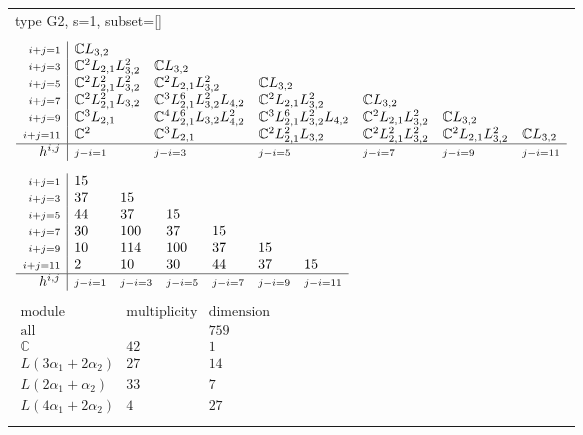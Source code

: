 \documentclass[crop,border=2mm]{standalone}
\begin{document}
\begin{tabular}{l}
{\huge type G2, s=1, subset=[]}\\ \\


$\displaystyle
\begin{array}{r|l l l l l l}
	{\scriptstyle i+j=1}&\mathbb{C}L_{3,2}&&&&&\\
	{\scriptstyle i+j=3}&\mathbb{C}^{2}L_{2,1}L_{3,2}^{2}&\mathbb{C}L_{3,2}&&&&\\
	{\scriptstyle i+j=5}&\mathbb{C}^{2}L_{2,1}^{2}L_{3,2}^{2}&\mathbb{C}^{2}L_{2,1}L_{3,2}^{2}&\mathbb{C}L_{3,2}&&&\\
	{\scriptstyle i+j=7}&\mathbb{C}^{2}L_{2,1}^{2}L_{3,2}&\mathbb{C}^{3}L_{2,1}^{6}L_{3,2}^{2}L_{4,2}&\mathbb{C}^{2}L_{2,1}L_{3,2}^{2}&\mathbb{C}L_{3,2}&&\\
	{\scriptstyle i+j=9}&\mathbb{C}^{3}L_{2,1}&\mathbb{C}^{4}L_{2,1}^{6}L_{3,2}L_{4,2}^{2}&\mathbb{C}^{3}L_{2,1}^{6}L_{3,2}^{2}L_{4,2}&\mathbb{C}^{2}L_{2,1}L_{3,2}^{2}&\mathbb{C}L_{3,2}&\\
	{\scriptstyle i+j=11}&\mathbb{C}^{2}&\mathbb{C}^{3}L_{2,1}&\mathbb{C}^{2}L_{2,1}^{2}L_{3,2}&\mathbb{C}^{2}L_{2,1}^{2}L_{3,2}^{2}&\mathbb{C}^{2}L_{2,1}L_{3,2}^{2}&\mathbb{C}L_{3,2}\\
	\hline h^{i,j}&{\scriptstyle j-i=1}&{\scriptstyle j-i=3}&{\scriptstyle j-i=5}&{\scriptstyle j-i=7}&{\scriptstyle j-i=9}&{\scriptstyle j-i=11}
\end{array}
$ \\ \\


$\displaystyle
\begin{array}{r|l l l l l l}
	{\scriptstyle i+j=1}&15&&&&&\\
	{\scriptstyle i+j=3}&37&15&&&&\\
	{\scriptstyle i+j=5}&44&37&15&&&\\
	{\scriptstyle i+j=7}&30&100&37&15&&\\
	{\scriptstyle i+j=9}&10&114&100&37&15&\\
	{\scriptstyle i+j=11}&2&10&30&44&37&15\\
	\hline h^{i,j}&{\scriptstyle j-i=1}&{\scriptstyle j-i=3}&{\scriptstyle j-i=5}&{\scriptstyle j-i=7}&{\scriptstyle j-i=9}&{\scriptstyle j-i=11}
\end{array}
$ \\ \\


$\displaystyle
\begin{array}{rll}
	\text{module}&\text{multiplicity}&\text{dimension} \\ \hline \text{all}&&759 \\
	\mathbb{C}&42&1\\
	L\left( 3\alpha_{1}+ 2\alpha_{2}\right)&27&14\\
	L\left( 2\alpha_{1}+\alpha_{2}\right)&33&7\\
	L\left( 4\alpha_{1}+ 2\alpha_{2}\right)&4&27
\end{array}
$ \\ \\

\end{tabular}
\end{document}
